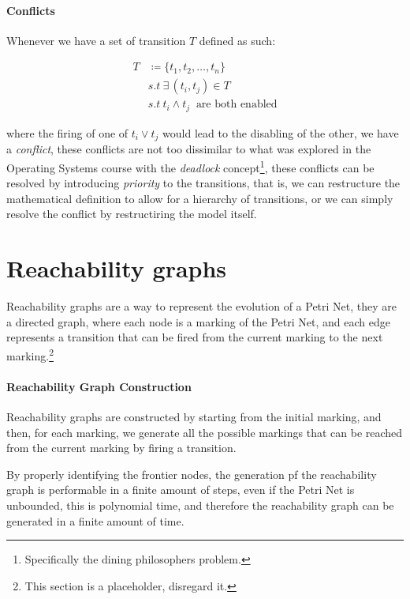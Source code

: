 \documentclass[openright, twoside, twocolumn]{report}
\begin{document}
    \paragraph{Conflicts}
    Whenever we have a set of transition $T$ defined as such:

  \begin{align}
    T &\coloneqq  \{ t_1, t_2, \ldots, t_n \}\\
    &s.t \ \exists\, (t_i, t_j) \in T \\
    &s.t \ t_i \land  t_j\ \text{ are both enabled}
  \end{align}

    where the firing of one of $t_i \lor t_j$ would lead to the disabling of
    the other, we have a \emph{conflict}, these conflicts are not too dissimilar to what was explored in the
    Operating Systems course with the \emph{deadlock} concept\footnote{
      Specifically the dining philosophers problem.
    }, these conflicts can be resolved by introducing \emph{priority} to the transitions, that is, we can
    restructure the mathematical definition to allow for a hierarchy of transitions, or we can simply resolve
    the conflict by restructiring the model itself.


    \section{Reachability graphs}

    Reachability graphs are a way to represent the evolution of a Petri Net, they are a directed graph, where
    each node is a marking of the Petri Net, and each edge represents a transition that can be fired from the
    current marking to the next marking.\footnote{
      This section is a placeholder, disregard it.
    }

    \paragraph{Reachability Graph Construction}

    Reachability graphs are constructed by starting from the initial marking, and then, for each marking, we
    generate all the possible markings that can be reached from the current marking by firing a transition.


    By properly identifying the frontier nodes, the generation pf the reachability graph
    is performable in a finite amount of steps, even if the Petri Net is unbounded, this is
    polynomial time, and therefore the reachability graph can be generated in a finite amount of time.
\end{document}
